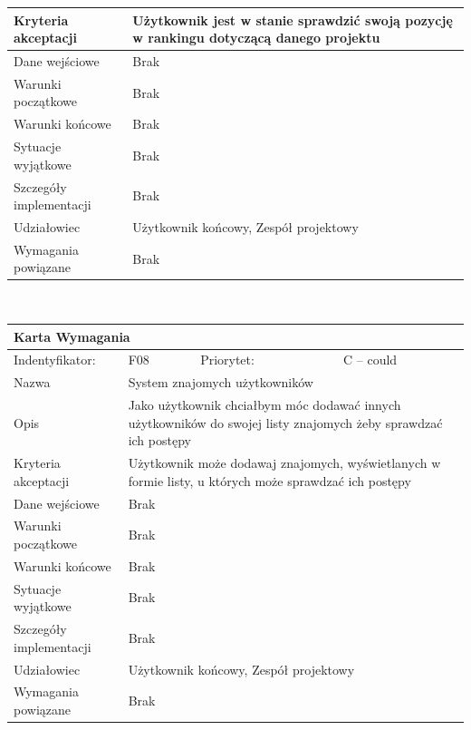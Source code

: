\documentclass[a4paper,11pt]{report}
\begin{document}
\begin{itemize}
\begin{itemize}
\begin{tabular}{|p{3cm}|p{2cm}|p{2cm}|p{6cm}|}
		\hline
		Kryteria akceptacji & \multicolumn{3}{|p{10 cm}|}{Użytkownik jest w stanie sprawdzić swoją pozycję w rankingu dotyczącą danego projektu}\\
		\hline
		Dane wejściowe & \multicolumn{3}{|p{10 cm}|}{Brak}\\
		\hline
		Warunki początkowe & \multicolumn{3}{|p{10 cm}|}{Brak}\\
		\hline
		Warunki końcowe & \multicolumn{3}{|p{10 cm}|}{Brak}\\
		\hline
		Sytuacje wyjątkowe & \multicolumn{3}{|p{10 cm}|}{Brak}\\
		\hline
		Szczegóły implementacji & \multicolumn{3}{|p{10 cm}|}{Brak}\\
		\hline
		Udziałowiec & \multicolumn{3}{|p{10 cm}|}{Użytkownik końcowy, Zespół projektowy}\\
		\hline
		Wymagania powiązane & \multicolumn{3}{|p{10 cm}|}{Brak}\\
		\hline
		\end{tabular}\\
		\begin{tabular}{|p{3cm}|p{2cm}|p{2cm}|p{6cm}|}
		\hline
		\multicolumn{4}{|p{12 cm}|}{Karta Wymagania}\\
		\hline
		Indentyfikator: & F08 & Priorytet: & C – could \\
		\hline
		Nazwa & \multicolumn{3}{|p{10 cm}|}{System znajomych użytkowników}\\
		\hline
		Opis & \multicolumn{3}{|p{10 cm}|}{Jako użytkownik chciałbym móc dodawać innych użytkowników do swojej listy znajomych żeby sprawdzać ich postępy}\\
		\hline
		Kryteria akceptacji & \multicolumn{3}{|p{10 cm}|}{Użytkownik może dodawaj znajomych, wyświetlanych w formie listy, u których może sprawdzać ich postępy}\\
		\hline
		Dane wejściowe & \multicolumn{3}{|p{10 cm}|}{Brak}\\
		\hline
		Warunki początkowe & \multicolumn{3}{|p{10 cm}|}{Brak}\\
		\hline
		Warunki końcowe & \multicolumn{3}{|p{10 cm}|}{Brak}\\
		\hline
		Sytuacje wyjątkowe & \multicolumn{3}{|p{10 cm}|}{Brak}\\
		\hline
		Szczegóły implementacji & \multicolumn{3}{|p{10 cm}|}{Brak}\\
		\hline
		Udziałowiec & \multicolumn{3}{|p{10 cm}|}{Użytkownik końcowy, Zespół projektowy}\\
		\hline
		Wymagania powiązane & \multicolumn{3}{|p{10 cm}|}{Brak}\\

\end{tabular}
\end{itemize}
\end{itemize}
\end{document}
